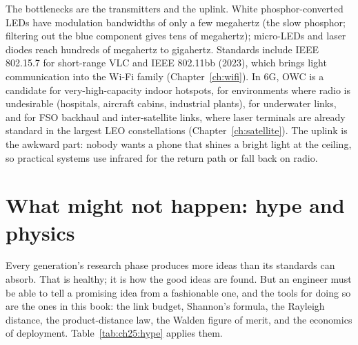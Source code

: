 
The bottlenecks are the transmitters and the uplink. White phosphor-converted LEDs have modulation
bandwidths of only a few megahertz (the slow phosphor; filtering out the blue component gives tens of
megahertz); micro-LEDs and laser diodes reach hundreds of megahertz to gigahertz. Standards include IEEE
802.15.7 for short-range VLC and IEEE 802.11bb (2023), which brings light communication into the Wi-Fi
family (Chapter~\ref{ch:wifi}). In 6G, OWC is a candidate for very-high-capacity indoor hotspots,
for environments where radio is undesirable (hospitals, aircraft cabins, industrial plants), for
underwater links, and for FSO backhaul and inter-satellite links, where laser terminals are already
standard in the largest LEO constellations (Chapter~\ref{ch:satellite}). The uplink is the awkward
part: nobody wants a phone that shines a bright light at the ceiling, so practical systems use
infrared for the return path or fall back on radio.

\section{What might not happen: hype and physics}
\label{sec:ch25:hype}

Every generation's research phase produces more ideas than its standards can absorb. That is healthy;
it is how the good ideas are found. But an engineer must be able to tell a promising idea from a
fashionable one, and the tools for doing so are the ones in this book: the link budget, Shannon's
formula, the Rayleigh distance, the product-distance law, the Walden figure of merit, and the
economics of deployment. Table~\ref{tab:ch25:hype} applies them.

